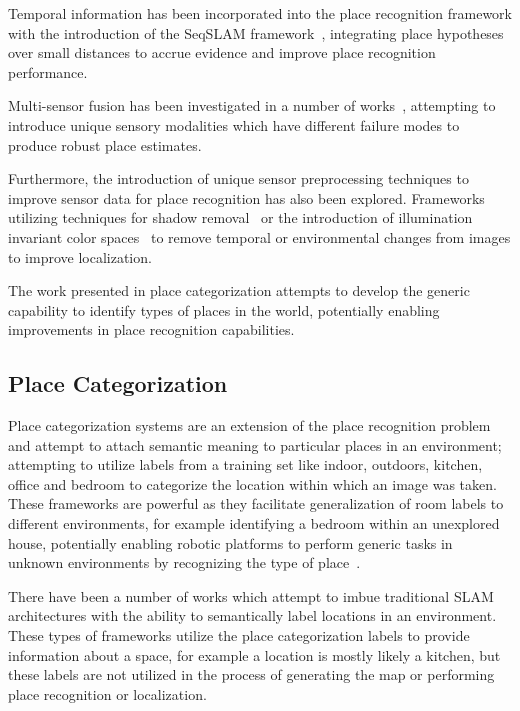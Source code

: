 \documentclass[letterpaper, 10 pt, conference]{ieeeconf}  %
\begin{document}
Temporal information has been incorporated into the place recognition framework with the introduction of the SeqSLAM framework~\cite{Milford2012}, integrating place hypotheses over small distances to accrue evidence and improve place recognition performance.

Multi-sensor fusion has been investigated in a number of works~\cite{tapus2006cognitive,Milford2013a}, attempting to introduce unique sensory modalities which have different failure modes to produce robust place estimates. 

Furthermore, the introduction of unique sensor preprocessing techniques to improve sensor data for place recognition has also been explored. Frameworks utilizing techniques for shadow removal~\cite{corke2013dealing} or the introduction of illumination invariant color spaces~\cite{mcmanus2014shady} to remove temporal or environmental changes from images to improve localization. 

The work presented in place categorization attempts to develop the generic capability to identify types of places in the world, potentially enabling improvements in place recognition capabilities. 


\subsection{Place Categorization}

Place categorization systems are an extension of the place recognition problem and attempt to attach semantic meaning to particular places in an environment; attempting to utilize labels from a training set like indoor, outdoors, kitchen, office and bedroom to categorize the location within which an image was taken. These frameworks are powerful as they facilitate generalization of room labels to different environments, for example identifying a bedroom within an unexplored house, potentially enabling robotic platforms to perform generic tasks in unknown environments by recognizing the type of place~\cite{wu2009visual}. 

There have been a number of works which attempt to imbue traditional SLAM architectures with the ability to semantically label locations in an environment\cite{sunderhauf2016place, ranganathan2011visual}. These types of frameworks utilize the place categorization labels to provide information about a space, for example a location is mostly likely a kitchen, but these labels are not utilized in the process of generating the map or performing place recognition or localization. 
\end{document}
